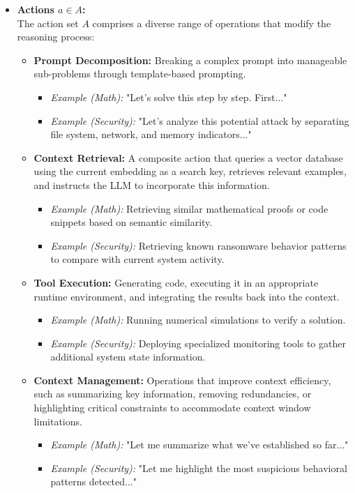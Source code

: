 \documentclass[10pt,journal,compsoc]{IEEEtran}
\begin{document}
\begin{itemize}
\item
  \textbf{Actions \(a \in A\):}\\
  The action set \(A\) comprises a diverse range of operations that modify the reasoning process:

  \begin{itemize}
  \item
    \textbf{Prompt Decomposition:} Breaking a complex prompt into
    manageable sub-problems through template-based prompting.
    \begin{itemize}
    \item \textit{Example (Math):} "Let's solve this step by step. First..."
    \item \textit{Example (Security):} "Let's analyze this potential attack by separating file system, network, and memory indicators..."
    \end{itemize}
    
  \item
    \textbf{Context Retrieval:} A composite action that queries a vector database using the current embedding as a search key, retrieves relevant examples, and instructs the LLM to incorporate this information.
    \begin{itemize}
    \item \textit{Example (Math):} Retrieving similar mathematical proofs or code snippets based on semantic similarity.
    \item \textit{Example (Security):} Retrieving known ransomware behavior patterns to compare with current system activity.
    \end{itemize}
    
  \item
    \textbf{Tool Execution:} Generating code, executing it in an appropriate runtime environment, and integrating the results back into the context.
    \begin{itemize}
    \item \textit{Example (Math):} Running numerical simulations to verify a solution.
    \item \textit{Example (Security):} Deploying specialized monitoring tools to gather additional system state information.
    \end{itemize}
    
  \item
    \textbf{Context Management:} Operations that improve context efficiency, such as summarizing key information, removing redundancies, or highlighting critical constraints to accommodate context window limitations.
    \begin{itemize}
    \item \textit{Example (Math):} "Let me summarize what we've established so far..."
    \item \textit{Example (Security):} "Let me highlight the most suspicious behavioral patterns detected..."
    \end{itemize}
    

\end{itemize}
\end{itemize}
\end{document}
